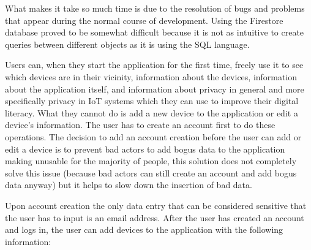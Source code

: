 What makes it take so much time is due to the resolution of bugs and
problems that appear during the normal course of development. Using
the Firestore database proved to be somewhat difficult because
it is not as intuitive to create queries between different objects
as it is using the SQL language.

Users can, when they start the application for the first time, freely use it to see
which devices are in their vicinity,
information about the devices, information about the application itself, and
information about privacy in general and more specifically privacy in IoT systems
which they can use to improve their digital literacy. What they cannot do is
add a new device to the application or edit a device's information. The user has
to create an account first to do these operations. The decision to add an
account creation before the user can add or edit a device is to prevent
bad actors to add bogus data to the application making unusable for the majority
of people, this solution does not completely solve this issue (because bad actors
can still create an account and add bogus data anyway) but it helps to slow
down the insertion of bad data.

Upon account creation the only data entry that can be considered sensitive that
the user has to input is an email address.
After the user has created an account and logs in, the user can add devices to the application with the following information:

